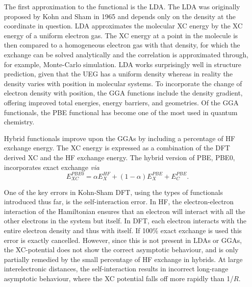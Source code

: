 The first approximation to the functional is the \ac{LDA}. The LDA was originally proposed by Kohn and Sham in 1965 and depends only on the density at the coordinate in question. LDA approximates the molecular \ac{XC} energy by the \ac{XC} energy of a uniform electron gas. The \ac{XC} energy at a point in the molecule is then compared to a homogeneous electron gas with that density, for which the exchange can be solved analytically and the correlation is approximated through, for example, Monte-Carlo simulation.\cite{Ullrich2012} LDA works surprisingly well in structure prediction, given that the UEG has a uniform density whereas in reality the density varies with position in molecular systems. To incorporate the change of electron density with position, the \ac{GGA} functions include the density gradient, offering improved total energies, energy barriers, and geometries. Of the \ac{GGA} functionals, the PBE functional has become one of the most used in quantum chemistry.\cite{Perdew1996}

Hybrid functionals improve upon the \ac{GGA}s by including a percentage of \ac{HF} exchange energy. The \ac{XC} energy is expressed as a combination of the \ac{DFT} derived \ac{XC} and the \ac{HF} exchange energy. The hybrid version of PBE, PBE0, incorporates exact exchange \textit{via}
\begin{equation}
    E_{XC}^{PBE0}=\alpha{}E_{X}^{HF}+(1-\alpha{})E_{X}^{PBE}+E_{C}^{PBE}.
\end{equation}


One of the key errors in Kohn-Sham \ac{DFT}, using the types of functionals introduced thus far, is the self-interaction error. In \ac{HF}, the electron-electron interaction of the Hamiltonian ensures that an electron will interact with all the other electrons in the system but itself. In \ac{DFT}, each electron interacts with the entire electron density and thus with itself. If 100\% exact exchange is used this error is exactly cancelled. However, since this is not present in \ac{LDA}s or \ac{GGA}s, the \ac{XC}-potential does not show the correct asymptotic behaviour, and is only partially remedied by the small percentage of \ac{HF} exchange in hybrids. At large interelectronic distances, the self-interaction results in incorrect long-range asymptotic behaviour, where the \ac{XC} potential falls off more rapidly than 1/$R$.

